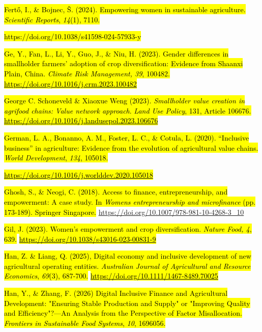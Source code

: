 \hl{Fertő, I., \& Bojnec, Š. (2024). Empowering women in sustainable
agriculture. \emph{Scientific Reports}, \emph{14}(1), 7110.}

\hl{https://doi.org/10.1038/s41598-024-57933-y}

\hl{Ge, Y., Fan, L., Li, Y., Guo, J., \& Niu, H. (2023). Gender
differences in smallholder farmers' adoption of crop diversification:
Evidence from Shaanxi Plain, China. \emph{Climate Risk Management, 39},
100482.}
\href{https://doi.org/10.1016/j.crm.2023.100482}{\hl{https://doi.org/10.1016/j.crm.2023.100482}}

\hl{George C. Schoneveld \& Xiaoxue Weng (2023). \emph{Smallholder value
creation in agrifood chains: Value network approach}. \emph{Land Use
Policy}, 131, Article 106676.}
\href{https://doi.org/10.1016/j.landusepol.2023.106676}{\hl{https://doi.org/10.1016/j.landusepol.2023.106676}}

\hl{German, L. A., Bonanno, A. M., Foster, L. C., \& Cotula, L. (2020).
``Inclusive business'' in agriculture: Evidence from the evolution of
agricultural value chains. \emph{World Development}, \emph{134},
105018.}

\href{https://doi.org/10.1016/j.worlddev.2020.105018}{\hl{https://doi.org/10.1016/j.worlddev.2020.105018}}

\hl{Ghosh, S., \& Neogi, C. (2018). Access to finance, entrepreneurship,
and empowerment: A case study. In \emph{Women\textquotesingle s
entrepreneurship and microfinance} (pp. 173-189). Springer Singapore.}
\href{https://doi.org/10.1007/978-981-10-4268-3_10}{\hl{}https://doi.org/10.1007/978-981-10-4268-3\_10}

\hl{Gil, J. (2023). Women's empowerment and crop diversification.
\emph{Nature Food, 4}, 639.}
\href{https://doi.org/10.1038/s43016-023-00831-9}{\hl{https://doi.org/10.1038/s43016-023-00831-9}}

\hl{Han, Z. \& Liang, Q. (2025), Digital economy and inclusive
development of new agricultural operating entities. \emph{Australian
Journal of Agricultural and Resource Economics}, \emph{69}(3), 687-700.}
\href{https://doi.org/10.1111/1467-8489.70025}{\hl{https://doi.org/10.1111/1467-8489.70025}}

\hl{Han, Y., \& Zhang, F. (2026) Digital Inclusive Finance and
Agricultural Development: "Ensuring Stable Production and Supply" or
"Improving Quality and Efficiency"?---An Analysis from the Perspective
of Factor Misallocation. \emph{Frontiers in Sustainable Food Systems},
\emph{10}, 1696056.}


